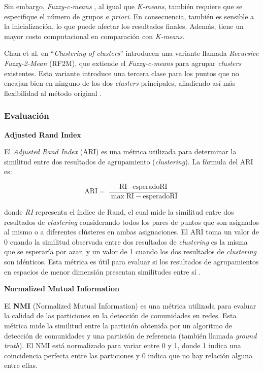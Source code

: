 \documentclass[11pt,a4paper,twoside,openany]{tesis}
\begin{document}
Sin embargo, \emph{Fuzzy-c-means} , al igual que \emph{K-means},  también requiere que se especifique el número de grupos \emph{a priori}. En consecuencia, también es sensible a la inicialización, lo que puede afectar los resultados finales. Además, tiene un mayor costo computacional en comparación con \emph{K-means}.

Chan et al. en ``\emph{Clustering of clusters}'' introducen una variante llamada \emph{Recursive Fuzzy-2-Mean} (RF2M), que extiende el \emph{Fuzzy-c-means} para agrupar \emph{clusters} existentes. Esta variante introduce una tercera clase para los puntos que no encajan bien en ninguno de los dos \emph{clusters} principales, añadiendo así más flexibilidad al método original \cite{fuzzy-k-means}.

\newpage
\subsubsection{Evaluación} \textbf{ }

\textbf{Adjusted Rand Index}

El \textit{Adjusted Rand Index} (ARI) es una métrica utilizada para determinar la similitud entre dos resultados de agrupamiento (\emph{clustering}). La fórmula del ARI es:

\begin{equation}
\text{ARI} = \frac{\text{RI} - \text{esperadoRI}}{\max \text{RI} - \text{esperadoRI}}
\end{equation}

donde \textit{RI} representa el índice de Rand, el cual mide la similitud entre dos resultados de \emph{clustering} considerando todos los pares de puntos que son asignados al mismo o a diferentes clústeres en ambas asignaciones. El ARI toma un valor de 0 cuando la similitud observada entre dos resultados de \emph{clustering} es la misma que se esperaría por azar, y un valor de 1 cuando los dos resultados de \emph{clustering} son idénticos. Esta métrica es útil para evaluar si los resultados de agrupamientos en espacios de menor dimensión presentan similitudes entre sí \cite{ari}.


\textbf{Normalized Mutual Information}

El \textbf{NMI} (Normalized Mutual Information) es una métrica utilizada para evaluar la calidad de las particiones en la detección de comunidades en redes. Esta métrica mide la similitud entre la partición obtenida por un algoritmo de detección de comunidades y una partición de referencia (también llamada \emph{ground truth}). El NMI está normalizado para variar entre 0 y 1, donde 1 indica una coincidencia perfecta entre las particiones y 0 indica que no hay relación alguna entre ellas.
\end{document}

